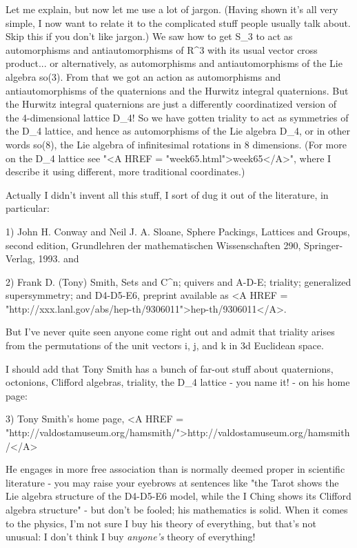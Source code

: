 Let me explain, but now let me use a lot of jargon.  (Having
shown it's all very simple, I now want to relate it to the
complicated stuff people usually talk about.  Skip this if
you don't like jargon.)  We saw how to get S_{3} to act as 
automorphisms and antiautomorphisms of R^{3} with its usual 
vector cross product... or alternatively, as automorphisms
and antiautomorphisms of the Lie algebra so(3).  From that
we got an action as automorphisms and antiautomorphisms of
the quaternions and the Hurwitz integral quaternions.  But
the Hurwitz integral quaternions are just a differently 
coordinatized version of the 4-dimensional lattice D_{4}!
So we have gotten triality to act as symmetries of the D_{4}
lattice, and hence as automorphisms of the Lie algebra D_{4},
or in other words so(8), the Lie algebra of infinitesimal 
rotations in 8 dimensions.  (For more on the D_{4} lattice see
"<A HREF = "week65.html">week65</A>", where I describe it using different, more traditional
coordinates.)

Actually I didn't invent all this stuff, I sort of dug
it out of the literature, in particular:

1)
John H. Conway and Neil J. A. Sloane, Sphere Packings, Lattices and
Groups, second edition, Grundlehren der mathematischen Wissenschaften
290, Springer-Verlag, 1993.
and

2) Frank D. (Tony) Smith, Sets and C^{n}; quivers and A-D-E; triality; 
generalized supersymmetry; and D4-D5-E6, preprint available as
<A HREF = "http://xxx.lanl.gov/abs/hep-th/9306011">hep-th/9306011</A>.

But I've never quite seen anyone come right out and admit
that triality arises from the permutations of the unit vectors
i, j, and k in 3d Euclidean space.

I should add that Tony Smith has a bunch of far-out stuff
about quaternions, octonions, Clifford algebras, triality,
the D_{4} lattice - you name it! - on his home page:


3) Tony Smith's home page, <A HREF =
"http://valdostamuseum.org/hamsmith/">http://valdostamuseum.org/hamsmith/</A>

He engages in more free association than is normally deemed
proper in scientific literature - you may raise your eyebrows at 
sentences like "the Tarot shows the Lie algebra structure of the 
D4-D5-E6 model, while the I Ching shows its Clifford algebra structure" 
- but don't be fooled; his mathematics is solid.  When it comes to the 
physics, I'm not sure I buy his theory of everything, but that's not 
unusual: I don't think I buy \emph{anyone's} theory of everything!

